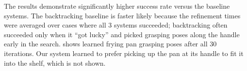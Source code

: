 The results demonstrate significantly higher success rate versus the baseline systems. The backtracking baseline is faster likely because
the refinement times were averaged over cases where all 3 systems succeeded; backtracking often succeeded only when
it ``got lucky'' and picked grasping poses along the handle early in the search.  shows learned frying pan
grasping poses after all 30 iterations. Our system learned to prefer picking up the pan at its handle to fit it into the shelf, which is not shown.
